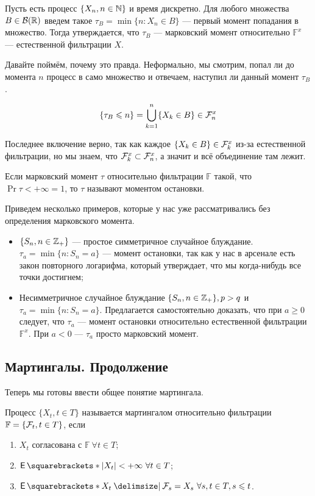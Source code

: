 \begin{example}
  Пусть есть процесс $\{X_n, n \in \mathbb{N}\}$ и время дискретно. Для любого множества
  $B \in \mathcal{B}(\mathbb{R})$ введем такое $\tau_B = \min\{n : X_n \in B\}$ --- первый момент
  попадания в множество. Тогда утверждается, что $\tau_B$ --- марковский момент
  относительно $\mathbb{F}^x$ --- естественной 
  фильтрации $X$.

  Давайте поймём, почему это правда. Неформально, мы смотрим, попал ли до момента
  $n$ процесс в само множество и отвечаем, наступил ли данный момент $\tau_B$.

  \[
    \{\tau_B \leqslant n\} = \bigcup\limits_{k = 1}^n \{X_k \in B\} \in \mathcal{F}_n^x
  \]

  Последнее включение верно, так как каждое $\{X_k \in B\} \in \mathcal{F}_k^x$ из-за
  естественной фильтрации, но мы знаем, что $\mathcal{F}_k^x \subset \mathcal{F}_n^x$, а значит
  и всё объединение там лежит.
\end{example}

\begin{definition}
  Если марковский момент $\tau$ относительно фильтрации $\mathbb{F}$ такой, что
  $\Pr{\tau < +\infty} = 1$, то $\tau$ называют моментом остановки.
\end{definition}

Приведем несколько примеров, которые у нас уже рассматривались без определения
марковского момента.

\begin{itemize}
  \item $\{S_n, n \in \mathbb{Z}_+\}$ --- простое симметричное случайное блуждание. 
  $\tau_a = \min\{n : S_n = a\}$ --- момент остановки, так как у нас в арсенале
  есть закон повторного логарифма, который утверждает, что мы когда-нибудь
  все точки достигнем;
  \item Несимметричное случайное блуждание $\{S_n, n \in \mathbb{Z}_+\}, p > q$ и
  $\tau_a = \min\{n : S_n = a\}$. Предлагается самостоятельно доказать, что
  при $a \geq 0$ следует, что $\tau_a$ --- момент остановки относительно
  естественной фильтрации $\mathbb{F}^x$. При $a < 0$ --- $\tau_a$ просто марковский
  момент.
\end{itemize}

\subsection{Мартингалы. Продолжение}

Теперь мы готовы ввести общее понятие мартингала.

\begin{definition}
  Процесс $\{X_t, t \in T\}$ называется мартингалом относительно фильтрации $\mathbb{F} =
  \{\mathcal{F}_t, t \in T\}$, если

  \begin{enumerate}
    \item $X_t$ согласована с $\mathbb{F} \ \forall t \in T$;
    \item $\E{|X_t|} < +\infty \ \forall t \in T$;
    \item $\E{X_t \given \F_s} = X_s \ \forall s, t \in T, s \leq t$.
  \end{enumerate}
\end{definition}

